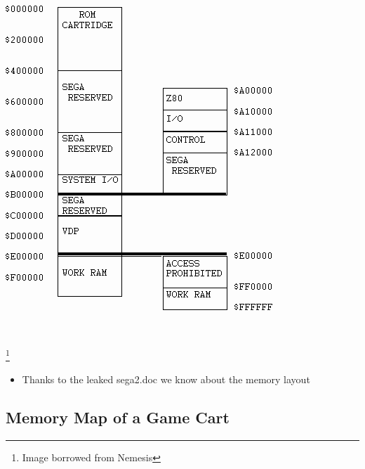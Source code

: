 \documentclass{beamer}
\begin{document}
\begin{frame}[fragile]
\frametitle{\insertsubsection}

\begin{center}
\includegraphics[height=.7\textheight]{img/mmap.png}
{~~~~\raggedright \footnote{Image borrowed from Nemesis}}
\end{center}

\begin{itemize}
\item {\small Thanks to the leaked sega2.doc we know about the memory layout}
\end{itemize}

\end{frame}


\subsection{Memory Map of a Game Cart}
\end{document}
